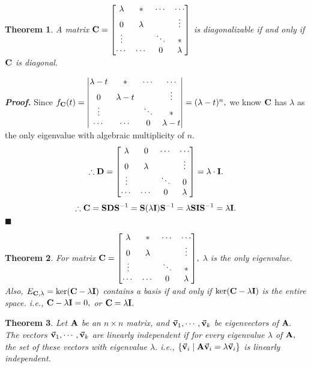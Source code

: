 \documentclass[12pt, a4paper]{article}
\newtheorem{thm}{Theorem}[subsection]
\newenvironment*{prf}{\par\indent\textbf{\textit{Proof. }}}{\hfill $\blacksquare$\par}
\def\vecv{\va{v}}
\def\matrixA{\vb{A}}
\def\matrixC{\vb{C}}
\def\matrixD{\vb{D}}
\def\matrixI{\vb{I}}
\def\matrixS{\vb{S}}
\begin{document}
\begin{thm}
	A matrix $\matrixC=\mqty[\lambda&*&\cdots&\cdots\\0&\lambda&&\vdots\\\vdots&&\ddots&*\\\cdots&\cdots&0&\lambda]$ is diagonalizable if and only if $\matrixC$ is diagonal.
\end{thm}
\begin{prf}
	Since $f_{\matrixC}(t)=\mqty|\lambda-t&*&\cdots&\cdots\\0&\lambda-t&&\vdots\\\vdots&&\ddots&*\\\cdots&\cdots&0&\lambda-t|=(\lambda-t)^n,$ we know $\matrixC$ has $\lambda$ as the only eigenvalue with algebraic multiplicity of $n.$ \[\therefore\matrixD=\mqty[\lambda&0&\cdots&\cdots\\0&\lambda&&\vdots\\\vdots&&\ddots&0\\\cdots&\cdots&0&\lambda]=\lambda\cdot\matrixI.\]\[\therefore\matrixC=\matrixS\matrixD\matrixS^{-1}=\matrixS(\lambda\matrixI)\matrixS^{-1}=\lambda\matrixS\matrixI\matrixS^{-1}=\lambda\matrixI.\]
\end{prf}
\begin{thm}
	For matrix $\matrixC=\mqty[\lambda&*&\cdots&\cdots\\0&\lambda&&\vdots\\\vdots&&\ddots&*\\\cdots&\cdots&0&\lambda],$ $\lambda$ is the only eigenvalue. Also, $E_{\matrixC,\lambda}=\ker(\matrixC-\lambda\matrixI)$ contains a basis if and only if $\ker(\matrixC-\lambda\matrixI)$ is the entire space. i.e., $\matrixC-\lambda\matrixI=0,$ or $\matrixC=\lambda\matrixI.$
\end{thm}
\begin{thm}
	Let $\matrixA$ be an $n\times n$ matrix, and $\vecv_1,\cdots,\vecv_k$ be eigenvectors of $\matrixA.$ The vectors $\vecv_1,\cdots,\vecv_k$ are linearly independent if for every eigenvalue $\lambda$ of $\matrixA,$ the set of these vectors with eigenvalue $\lambda.$ i.e., $\qty{\vecv_i\mid\matrixA\vecv_i=\lambda\vecv_i}$ is linearly independent. 
\end{thm}
\end{document}
